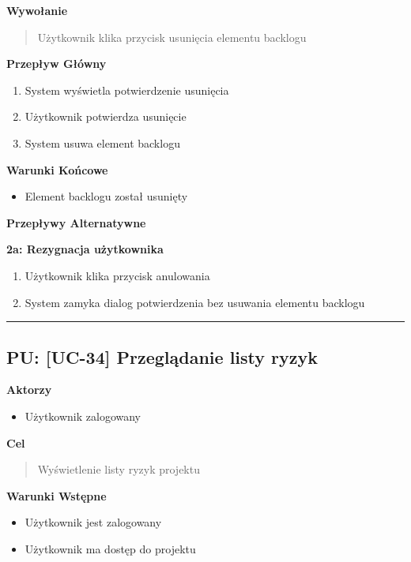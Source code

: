 \vspace{0.2cm}
\noindent\textbf{Wywołanie}
\begin{quote}
    Użytkownik klika przycisk usunięcia elementu backlogu
\end{quote}

\vspace{0.2cm}
\noindent\textbf{Przepływ Główny}
\begin{enumerate}
    \item System wyświetla potwierdzenie usunięcia
    \item Użytkownik potwierdza usunięcie
    \item System usuwa element backlogu
\end{enumerate}

\vspace{0.2cm}
\noindent\textbf{Warunki Końcowe}
\begin{itemize}
    \item Element backlogu został usunięty
\end{itemize}

\vspace{0.2cm}
\noindent\textbf{Przepływy Alternatywne}

\textbf{2a: Rezygnacja użytkownika}
\begin{enumerate}
    \item Użytkownik klika przycisk anulowania
    \item System zamyka dialog potwierdzenia bez usuwania elementu backlogu
\end{enumerate}


\hrule
\vspace{1cm}

\subsection*{PU: [UC-34] Przeglądanie listy ryzyk}

\noindent\textbf{Aktorzy}
\begin{itemize}
    \item Użytkownik zalogowany
\end{itemize}

\vspace{0.2cm}
\noindent\textbf{Cel}
\begin{quote}
    Wyświetlenie listy ryzyk projektu
\end{quote}

\vspace{0.2cm}
\noindent\textbf{Warunki Wstępne}
\begin{itemize}
    \item Użytkownik jest zalogowany
    \item Użytkownik ma dostęp do projektu
\end{itemize}

